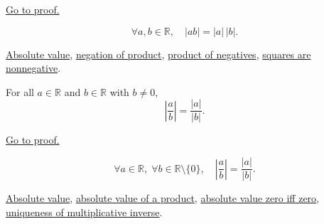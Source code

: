 \begin{remark*}[Proof]
\hyperref[prf:absolute-value-product]{Go to proof.}
\end{remark*}

\begin{remark*}
\[
  \forall a, b \in \mathbb{R},\quad
  \lvert ab \rvert = \lvert a \rvert\,\lvert b \rvert.
\]
\end{remark*}

\begin{dependencies}
\hyperref[def:absolute-value]{Absolute value},
\hyperref[thm:ring-negation-of-product]{negation of product},
\hyperref[thm:ring-product-of-negatives]{product of negatives},
\hyperref[thm:ordered-field-squares-nonnegative]{squares are nonnegative}.
\end{dependencies}


\begin{theorem}
\label{thm:absolute-value-quotient}
For all $a \in \mathbb{R}$ and $b \in \mathbb{R}$ with $b \ne 0$,
\[
  \left\lvert \frac{a}{b} \right\rvert
  = \frac{\lvert a \rvert}{\lvert b \rvert}.
\]
\end{theorem}



\begin{remark*}[Proof]
\hyperref[prf:absolute-value-quotient]{Go to proof.}
\end{remark*}

\begin{remark*}
\[
  \forall a \in \mathbb{R},\;
  \forall b \in \mathbb{R} \setminus \{0\},\quad
  \left\lvert \frac{a}{b} \right\rvert
  = \frac{\lvert a \rvert}{\lvert b \rvert}.
\]
\end{remark*}

\begin{dependencies}
\hyperref[def:absolute-value]{Absolute value},
\hyperref[thm:absolute-value-product]{absolute value of a product},
\hyperref[thm:absolute-value-zero-iff-zero]{absolute value zero iff zero},
\hyperref[cor:uniqueness-multiplicative-inverse-on-q]{uniqueness of
multiplicative inverse}.
\end{dependencies}


